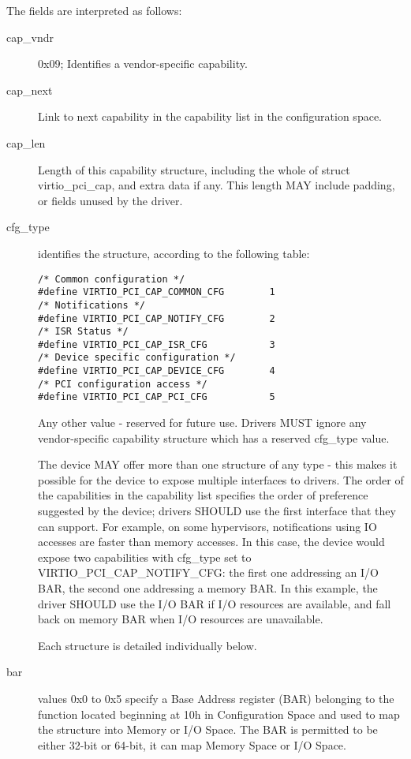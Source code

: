 The fields are interpreted as follows:

\begin{description}
\item[cap_vndr]
        0x09; Identifies a vendor-specific capability.

\item[cap_next]
        Link to next capability in the capability list in the configuration space.

\item[cap_len]
        Length of this capability structure, including the whole of
        struct virtio_pci_cap, and extra data if any.
        This length MAY include padding, or fields unused by the driver.

\item[cfg_type]
        identifies the structure, according to the following table:

\begin{lstlisting}
/* Common configuration */
#define VIRTIO_PCI_CAP_COMMON_CFG        1
/* Notifications */
#define VIRTIO_PCI_CAP_NOTIFY_CFG        2
/* ISR Status */
#define VIRTIO_PCI_CAP_ISR_CFG           3
/* Device specific configuration */
#define VIRTIO_PCI_CAP_DEVICE_CFG        4
/* PCI configuration access */
#define VIRTIO_PCI_CAP_PCI_CFG           5
\end{lstlisting}

        Any other value - reserved for future use. Drivers MUST
        ignore any vendor-specific capability structure which has
        a reserved cfg_type value.

        The device MAY offer more than one structure of any type - this makes it
        possible for the device to expose multiple interfaces to drivers.  The order of
        the capabilities in the capability list specifies the order of preference
        suggested by the device; drivers SHOULD use the first interface that they can
        support.  For example, on some hypervisors, notifications using IO accesses are
        faster than memory accesses. In this case, the device would expose two
        capabilities with cfg_type set to VIRTIO_PCI_CAP_NOTIFY_CFG:
        the first one addressing an I/O BAR, the second one addressing a memory BAR.
        In this example, the driver SHOULD use the I/O BAR if I/O resources are available, and fall back on
        memory BAR when I/O resources are unavailable.

        Each structure is detailed individually below.

\item[bar]
        values 0x0 to 0x5 specify a Base Address register (BAR) belonging to
        the function located beginning at 10h in Configuration Space
        and used to map the structure into Memory or I/O Space.
        The BAR is permitted to be either 32-bit or 64-bit, it can map Memory Space
        or I/O Space.


\end{description}

